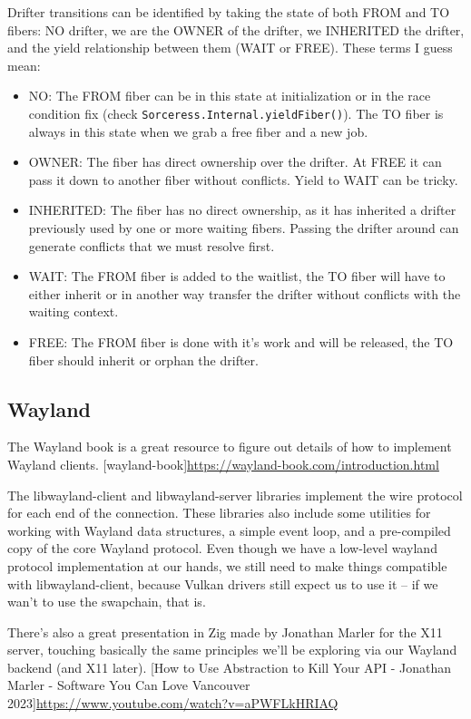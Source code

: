 Drifter transitions can be identified by taking the state of both FROM and TO fibers:
NO drifter, we are the OWNER of the drifter, we INHERITED the drifter, and the yield relationship between them (WAIT or FREE). 
These terms I guess mean:
\begin{itemize}
    \item NO: The FROM fiber can be in this state at initialization or in the race condition fix (check \texttt{Sorceress.Internal.yieldFiber()}). 
        The TO fiber is always in this state when we grab a free fiber and a new job.
    \item OWNER: The fiber has direct ownership over the drifter. At FREE it can pass it down to another fiber without conflicts. Yield to WAIT can be tricky.
    \item INHERITED: The fiber has no direct ownership, as it has inherited a drifter previously used by one or more waiting fibers. 
        Passing the drifter around can generate conflicts that we must resolve first.
    \item WAIT: The FROM fiber is added to the waitlist, the TO fiber will have to either inherit or in another way transfer the drifter without conflicts with the waiting context.
    \item FREE: The FROM fiber is done with it's work and will be released, the TO fiber should inherit or orphan the drifter.
\end{itemize}

\subsection{Wayland}
The Wayland book is a great resource to figure out details of how to implement Wayland clients.
[wayland-book]\url{https://wayland-book.com/introduction.html}

The libwayland-client and libwayland-server libraries implement the wire protocol for each end of the connection.
These libraries also include some utilities for working with Wayland data structures, a simple event loop, and a pre-compiled copy of the core Wayland protocol.
Even though we have a low-level wayland protocol implementation at our hands, we still need to make things compatible with libwayland-client,
because Vulkan drivers still expect us to use it -- if we wan't to use the swapchain, that is.

There's also a great presentation in Zig made by Jonathan Marler for the X11 server, touching basically the same principles we'll be exploring via our Wayland backend (and X11 later).
[How to Use Abstraction to Kill Your API - Jonathan Marler - Software You Can Love Vancouver 2023]\url{https://www.youtube.com/watch?v=aPWFLkHRIAQ}

